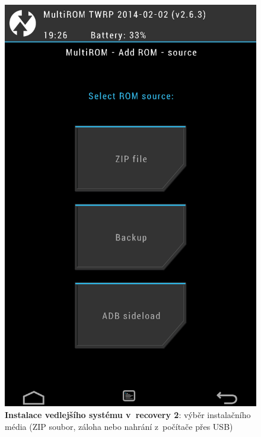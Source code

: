\documentclass[12pt, a4paper, oneside]{article}
\newcommand{\B}{\textbf} %
\begin{document}
\begin{figure}[H]
\begin{center}
 \includegraphics[height=\textheight-40]{img/recovery_install2.png}
\caption{\B{Instalace vedlejšího systému v~recovery 2}: výběr instalačního média (ZIP soubor, záloha nebo nahrání z~počítače přes USB)}
\end{center}
\end{figure}
\end{document}
